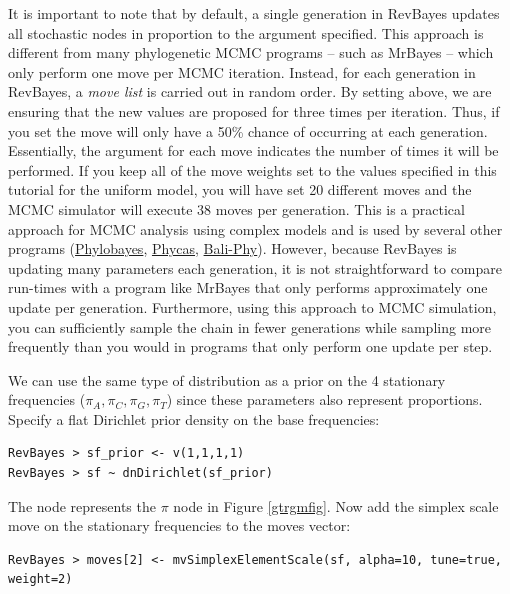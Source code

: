It is important to note that by default, a single generation in RevBayes updates all stochastic nodes in proportion to the  argument specified. 
This approach is different from many phylogenetic MCMC programs -- such as MrBayes -- which only perform one move per MCMC iteration. 
Instead, for each generation in RevBayes, a \textit{move list} is carried out in random order. 
By setting  above, we are ensuring that the new values are proposed for  three times per iteration. 
Thus, if you set  the move will only have a 50\% chance of occurring at each generation. 
Essentially, the  argument for each move indicates the number of times it will be performed.
If you keep all of the move weights set to the values specified in this tutorial for the uniform model, you will have set 20 different moves and the MCMC simulator will execute 38 moves per generation.
This is a practical approach for MCMC analysis using complex models and is used by several other programs (\href{http://megasun.bch.umontreal.ca/People/lartillot/www/index.htm}{Phylobayes}, \href{http://hydrodictyon.eeb.uconn.edu/projects/phycas/index.php/Phycas_Home}{Phycas}, \href{http://www.bali-phy.org/}{Bali-Phy}).
However, because RevBayes is updating many parameters each generation, it is not straightforward to compare run-times with a program like MrBayes that only performs approximately one update per generation. 
Furthermore, using this approach to MCMC simulation, you can sufficiently sample the chain in fewer generations while sampling more frequently than you would in programs that only perform one update per step.

We can use the same type of distribution as a prior on the 4 stationary frequencies ($\pi_A, \pi_C, \pi_G, \pi_T$) since these parameters also represent proportions. 
Specify a flat Dirichlet prior density on the base frequencies:
{\tt \begin{snugshade*}
\begin{lstlisting}
RevBayes > sf_prior <- v(1,1,1,1) 
RevBayes > sf ~ dnDirichlet(sf_prior)
\end{lstlisting}
\end{snugshade*}}

The node  represents the $\pi$ node in Figure \ref{gtrgmfig}.
Now add the simplex scale move on the stationary frequencies to the moves vector:
{\tt \small \begin{snugshade*}
\begin{lstlisting}
RevBayes > moves[2] <- mvSimplexElementScale(sf, alpha=10, tune=true, weight=2)  
\end{lstlisting}
\end{snugshade*}}

